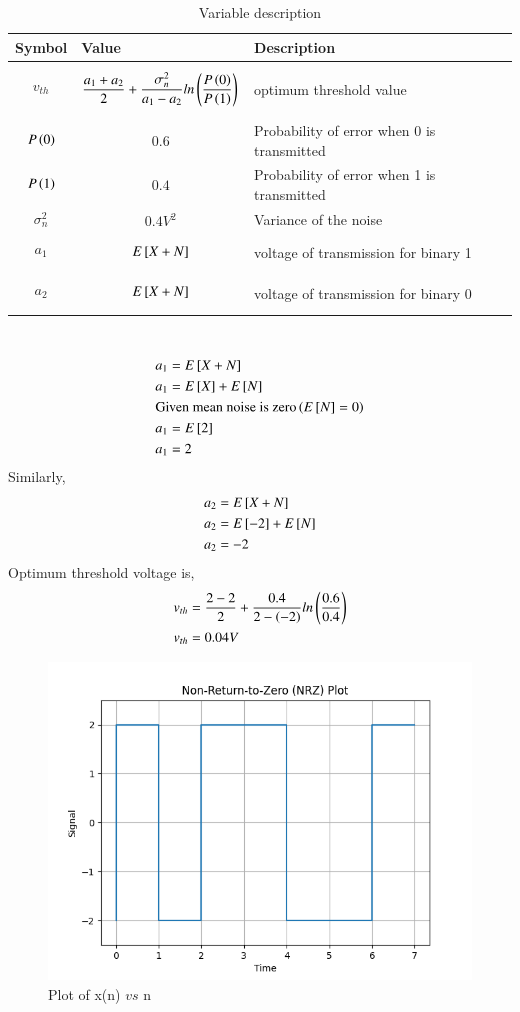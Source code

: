 \documentclass[journal,12pt,twocolumn]{IEEEtran}
\theoremstyle{remark}
\begin{document}
\solution
\begin{table}[h]
    \centering
    \begin{tabular}{|p{1cm}|p{3.80cm}|p{2.70cm}|}
    \hline
    Symbol&Value&Description\\ \hline
    $$v_{th}$$&$$\frac{a_1+a_2}{2}+\frac{\sigma_{n}^{2}}{a_1-a_2}ln\left(\frac{P\left(0\right)}{P\left(1\right)}\right)$$&optimum threshold value\\\hline
    $$P\left(0\right)$$&$$0.6$$&Probability of error when 0 is transmitted\\\hline
    $$P\left(1\right)$$&$$0.4$$&Probability of error when 1 is transmitted\\\hline
    $$\sigma_{n}^{2}$$&$$0.4V^2$$&Variance of the noise\\\hline
    $$a_1$$&$$E{}\left[X+N\right]$$&voltage of transmission for binary 1\\\hline
    $$a_2$$&$$E{}\left[X+N\right]$$&voltage of transmission for binary 0\\\hline
    \end{tabular}
    \caption{Variable description}
    \label{tab:GATE.2022.EC.53.1}
\end{table}\\
\begin{align}
    &a_1=E{}\left[X+N\right]\\
    &a_1=E{}\left[X\right]+E{}\left[N\right]\\
    &\text{Given mean noise is zero}\left(E{}\left[N\right]=0\right)\\
    &a_1=E{}\left[2\right]\\
    &a_1=2
\end{align}
Similarly,
\begin{align}
    &a_2=E{}\left[X+N\right]\\
    &a_2=E{}\left[-2\right]+E{}\left[N\right]\\
    &a_2=-2
\end{align}
Optimum threshold voltage is,
\begin{align}
    &v_{th}=\frac{2-2}{2}+\frac{0.4}{2-\left(-2\right)}ln\left(\frac{0.6}{0.4}\right)\\
    &v_{th}=0.04V
\end{align}
\begin{figure}[ht]
    \centering
    \includegraphics[width=\columnwidth]{figs/Figure_1.png}
    \caption{Plot of x(n) $vs$ n}
    \label{fig:GATE.2022.EC.53.2}
\end{figure}
\end{document}
